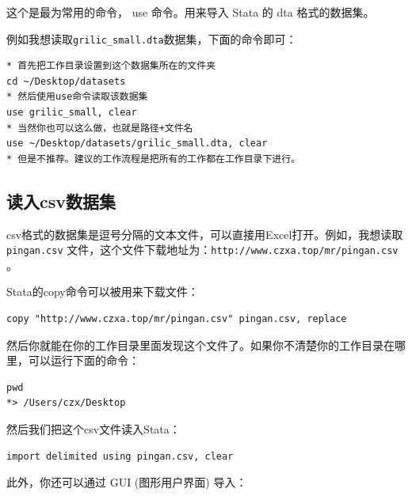 \documentclass[]{ctexbook}
\begin{document}
这个是最为常用的命令， use 命令。用来导入 Stata 的 dta 格式的数据集。

例如我想读取\texttt{grilic\_small.dta}数据集，下面的命令即可：

\begin{lstlisting}
* 首先把工作目录设置到这个数据集所在的文件夹
cd ~/Desktop/datasets
* 然后使用use命令读取该数据集
use grilic_small, clear
* 当然你也可以这么做，也就是路径+文件名
use ~/Desktop/datasets/grilic_small.dta, clear
* 但是不推荐。建议的工作流程是把所有的工作都在工作目录下进行。
\end{lstlisting}

\hypertarget{csv}{%
\subsection{读入csv数据集}\label{csv}}

csv格式的数据集是逗号分隔的文本文件，可以直接用Excel打开。例如，我想读取 \texttt{pingan.csv} 文件，这个文件下载地址为：\texttt{http://www.czxa.top/mr/pingan.csv} 。

Stata的copy命令可以被用来下载文件：

\begin{lstlisting}
copy "http://www.czxa.top/mr/pingan.csv" pingan.csv, replace
\end{lstlisting}

然后你就能在你的工作目录里面发现这个文件了。如果你不清楚你的工作目录在哪里，可以运行下面的命令：

\begin{lstlisting}
pwd
*> /Users/czx/Desktop
\end{lstlisting}

然后我们把这个csv文件读入Stata：

\begin{lstlisting}
import delimited using pingan.csv, clear
\end{lstlisting}

此外，你还可以通过 GUI (图形用户界面) 导入：
\end{document}
